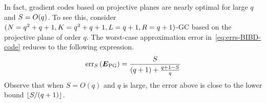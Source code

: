 \documentclass[conference,letterpaper]{IEEEtran}
\begin{document}
In fact, gradient codes based on projective planes are nearly optimal for large $q$ and $S = O(q)$.
To see this, consider \mbox{$(N = q^2+q+1, K = q^2+q+1, L = q+1, R = q+1)$-GC} based on the projective plane of order $q$. The worst-case approximation error in~\eqref{eq:errs-BIBD-code} reduces to the following expression.
\begin{equation}
    \label{eq:errs-PG-2}
    \mathrm{err}_{S}\left(\boldsymbol{E}_{\textrm{PG}}\right) = \frac{S}{(q+1)+\frac{q+1-S}{q}}
\end{equation}
Observe that when $S = O(q)$ and $q$ is large, the error above is close to the lower bound $\lfloor S/(q+1) \rfloor$.




\end{document}
